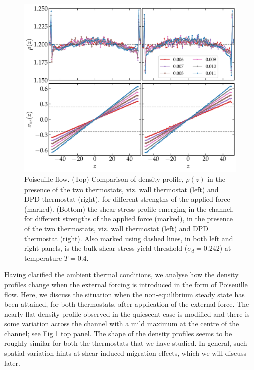 \begin{figure}[htb!]
\centering
\includegraphics[width=15cm]{figs/denStress.pdf}
\caption[{\em Comparison of density and stress profiles in the presence of the two thermostats}]{Poiseuille flow. (Top) Comparison of  density profile, $\rho(z)$ in the presence of the two thermostats, viz. wall thermostat (left) and DPD thermostat (right), for different strengths of the applied force (marked). (Bottom) the shear stress profile emerging in the channel, for different strengths of the applied force (marked), in the presence of the two thermostats, viz. wall thermostat (left) and DPD thermostat (right). Also marked using dashed lines, in both left and right panels, is the bulk shear stress yield threshold ($\sigma_d=0.242$) at temperature $T=0.4$.}
\label{fig2}
\end{figure}

Having clarified the ambient thermal conditions, we analyse how the density profiles change when the external forcing is introduced in the form of Poiseuille flow. Here, we discuss the situation when the non-equilibrium steady state has been attained, for both thermostats, after application of the external force. The nearly flat density profile observed in the quiescent case is modified and there is some variation across the channel with a mild maximum at the centre of the channel; see Fig.\ref{fig2} top panel. The shape of the density profiles seems to be roughly similar for both the thermostats that we have studied. In general, such spatial variation hints at shear-induced migration effects, which we will discuss later.

